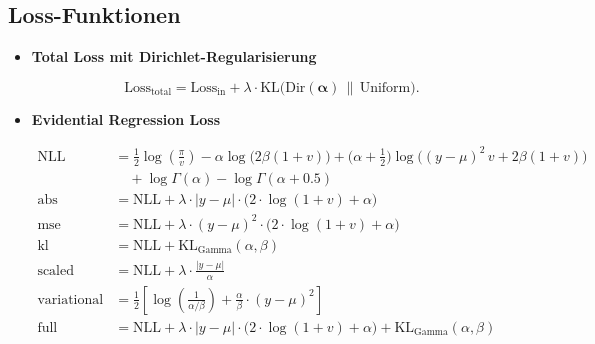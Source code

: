 \begin{formelsammlung}
    \section*{Loss-Funktionen}
    \begin{mdframed}[style=exercise]
    \begin{itemize}[label={},left=0pt]
        \item \textbf{Total Loss mit Dirichlet-Regularisierung}
        
        {\scriptsize \[
        \text{Loss}_{\text{total}} 
        = \text{Loss}_{\text{in}} 
        + \lambda \cdot \text{KL}\bigl(\text{Dir}(\boldsymbol{\alpha}) 
        \,\|\, \text{Uniform}\bigr).
        \]}

        \item \textbf{Evidential Regression Loss}

        {\scriptsize
        \begin{align*}
        \text{NLL} 
        &= 
        \tfrac{1}{2}\log\left(\frac{\pi}{v}\right)
        - \alpha \log \bigl(2\beta(1+v)\bigr) 
        + \bigl(\alpha + \tfrac{1}{2}\bigr) 
            \log\bigl((y - \mu)^2\, v + 2\beta(1+v)\bigr) \\
        &\quad 
        + \log\Gamma(\alpha) 
        - \log\Gamma(\alpha + 0.5)
        \\[1em]
        \text{abs} 
        &= \text{NLL} 
            + \lambda \cdot |y - \mu| 
            \cdot \bigl(2\cdot \log(1+v) + \alpha\bigr)
        \\[1em]
        \text{mse} 
        &= \text{NLL} 
            + \lambda \cdot (y - \mu)^2 
            \cdot \bigl(2\cdot \log(1+v) + \alpha\bigr)
        \\[1em]
        \text{kl} 
        &= \text{NLL} 
            + \text{KL}_{\text{Gamma}}(\alpha,\beta)
        \\[1em]
        \text{scaled} 
        &= \text{NLL} 
            + \lambda \cdot \frac{|y - \mu|}{\alpha}
        \\[1em]
        \text{variational}
        &= 
        \frac{1}{2}
        \left[
            \log\left(\frac{1}{\alpha/\beta}\right)
            + \frac{\alpha}{\beta} \cdot (y - \mu)^2
        \right]
        \\[1em]
        \text{full}
        &= 
        \text{NLL} 
        + \lambda \cdot |y - \mu| \cdot \bigl(2\cdot \log(1+v) + \alpha\bigr)
        + \text{KL}_{\text{Gamma}}(\alpha,\beta)
        \end{align*}
        }
    \end{itemize}
    \end{mdframed}


\end{formelsammlung}


\restoregeometry

